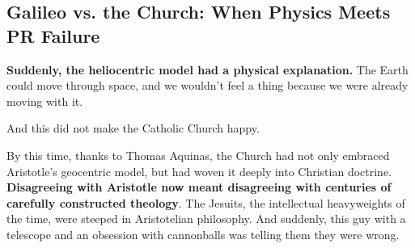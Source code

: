 \subsection{Galileo vs. the Church: When Physics Meets PR Failure}

\textbf{Suddenly, the heliocentric model had a physical explanation.} The Earth could move through space, and we wouldn’t feel a thing because we were already moving with it. 

And this did not make the Catholic Church happy.

By this time, thanks to Thomas Aquinas, the Church had not only embraced Aristotle’s geocentric model, but had woven it deeply into Christian doctrine. \textbf{Disagreeing with Aristotle now meant disagreeing with centuries of carefully constructed theology}. The Jesuits, the intellectual heavyweights of the time, were steeped in Aristotelian philosophy.  And suddenly, this guy with a telescope and an obsession with cannonballs was telling them they were wrong.

\medskip

